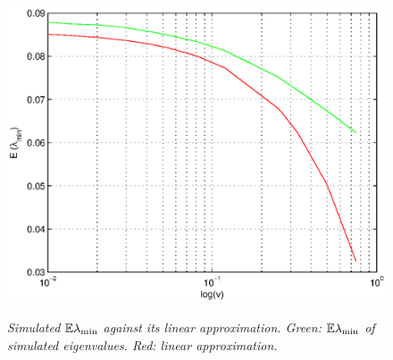 \documentclass{article}
\begin{document}
\begin{figure}[htb!]
{    \includegraphics[scale=0.35]{../pics/lambda_min_q0.5.eps}
    \label{fig:lambda_min_q0.5}
  }
  \caption{\small \it Simulated $\mathbb{E} \lambda_{\text{min}}$ against its linear
    approximation. Green: $\mathbb{E} \lambda_{\text{min}}$ of simulated
    eigenvalues. Red: linear approximation.}
  \label{fig:lambda_min_verified}
\end{figure}




\end{document}
